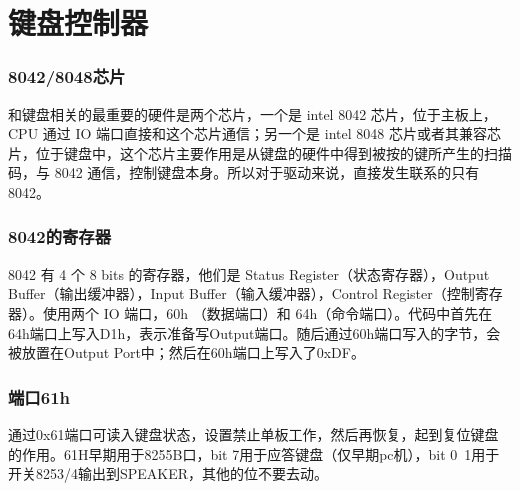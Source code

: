 \documentclass[12pt]{article}
\begin{document}
\part{键盘控制器}
\section{8042/8048芯片}
和键盘相关的最重要的硬件是两个芯片，一个是 intel 8042 芯片，位于主板上，CPU 通过 IO 端口直接和这个芯片通信；另一个是 intel 8048 芯片或者其兼容芯片，位于键盘中，这个芯片主要作用是从键盘的硬件中得到被按的键所产生的扫描码，与 8042 通信，控制键盘本身。所以对于驱动来说，直接发生联系的只有 8042。
\section{8042的寄存器}
8042 有 4 个 8 bits 的寄存器，他们是 Status Register（状态寄存器），Output Buffer（输出缓冲器），Input Buffer（输入缓冲器），Control Register（控制寄存器）。使用两个 IO 端口，60h （数据端口）和 64h（命令端口）。代码中首先在64h端口上写入D1h，表示准备写Output端口。随后通过60h端口写入的字节，会被放置在Output Port中；然后在60h端口上写入了0xDF。
\section{端口61h}
通过0x61端口可读入键盘状态，设置禁止单板工作，然后再恢复，起到复位键盘的作用。61H早期用于8255B口，bit 7用于应答键盘（仅早期pc机），bit 0~1用于开关8253/4输出到SPEAKER，其他的位不要去动。
\end{document}
